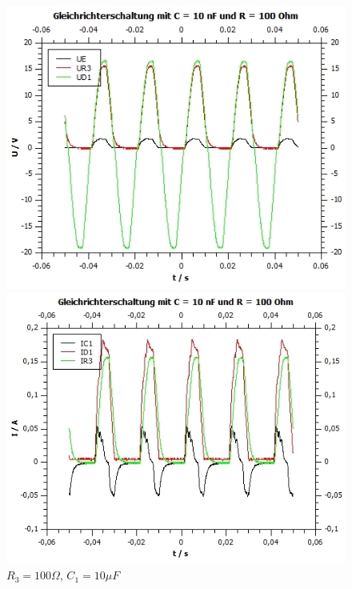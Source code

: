 \documentclass[12pt,a4paper,twoside]{article}
\begin{document}
\begin{figure}[H]
    \begin{minipage}[b]{.5\linewidth} %
        \includegraphics[width=1\linewidth]{nudes/Aufgabe 3 plots/100 ohm 10 uf U.jpg}
        \caption{$R_3 = 100 \Omega$, $C_1 = 10 \mu F$}
    \end{minipage}
    \hspace{0.01\linewidth}%
    \begin{minipage}[b]{.5\linewidth} %
        \includegraphics[width=1\linewidth]{nudes/Aufgabe 3 plots/100 ohm 10 uf I.jpg}
    \caption{$R_3 = 100 \Omega$, $C_1 = 10 \mu F$}
    \end{minipage}
\end{figure}
\end{document}
